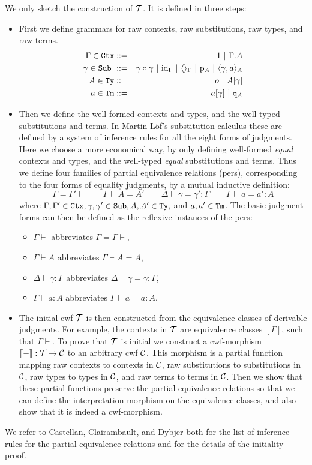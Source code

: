 \documentclass{lmcs}
\def\id{\mathrm{id}}
\begin{document}
We only sketch the construction of ${\mathcal T}$. It is defined in three steps:
\begin{itemize}
\item 
First we define grammars for raw contexts, raw substitutions, raw types, and raw terms.
\begin{eqnarray*}
\Gamma \in \RawCtx &::=& 1  \ |\ \Gamma\cext A\\
\gamma \in \RawSub \ &::=& \gamma \circ \gamma \ |\ \id_\Gamma \ |\ \langle\rangle_\Gamma \ |\ \p_{A} \ |\ \langle \gamma, a \rangle_A\\
A \in \RawTy &::=& o \ |\  A[\gamma]\\
a \in \RawTm &::=& a[\gamma] \ |\ \qI_A
\end{eqnarray*}
\item
Then we define the well-formed contexts and types, and the well-typed
substitutions and terms. In Martin-L\"of's substitution calculus these are defined by a system of inference rules for all the eight forms of judgments. Here we choose a more economical way, by only defining well-formed \emph{equal} contexts and types, and the well-typed \emph{equal} substitutions and terms. Thus we define four families of partial equivalence relations (pers), corresponding to the four forms of equality judgments, by a mutual inductive definition:
$$
\Gamma = \Gamma' \vdash
\qquad
\Gamma \vdash A = A' 
\qquad
\Delta \vdash \gamma = \gamma' : \Gamma
\qquad
\Gamma \vdash a = a' : A
$$
where $\Gamma, \Gamma' \in {\tt Ctx}, \gamma, \gamma' \in {\tt Sub}, A, A' \in {\tt Ty},$ and $a,a' \in {\tt Tm}$. The basic judgment forms can then be defined as the reflexive instances of the pers:
\begin{itemize}
\item 
$\Gamma \vdash$ abbreviates $\Gamma = \Gamma \vdash$, 
\item
$\Gamma \vdash A$ abbreviates $\Gamma \vdash A = A$,
\item
$\Delta \vdash \gamma : \Gamma$ abbreviates  $\Delta \vdash \gamma = \gamma : \Gamma$, 
\item
$\Gamma \vdash a : A$ abbreviates $\Gamma \vdash a = a : A$.
\end{itemize}
\item
The initial cwf ${\mathcal T}$ is then constructed from the equivalence classes of derivable judgments. For example, the contexts in ${\mathcal T}$ are equivalence classes $[\Gamma]$, such that $\Gamma \vdash$. To prove that ${\mathcal T}$ is initial we construct a cwf-morphism $\llbracket - \rrbracket : {\mathcal T} \to {\mathcal C}$ to an arbitrary cwf ${\mathcal C}$. This morphism is a partial function mapping raw contexts to contexts in ${\mathcal C}$, raw substitutions to substitutions in ${\mathcal C}$, raw types to types in ${\mathcal C}$, and raw terms to terms in ${\mathcal C}$. Then we show that these partial functions preserve the partial equivalence relations so that we can define the interpretation morphism on the equivalence classes, and also show that it is indeed a cwf-morphism.
\end{itemize}
We refer to Castellan, Clairambault, and Dybjer \cite{castellan:tlca2015,castellan:lmcs} both for the list of inference rules for the partial equivalence relations and for the details of the initiality proof.
\end{document}
